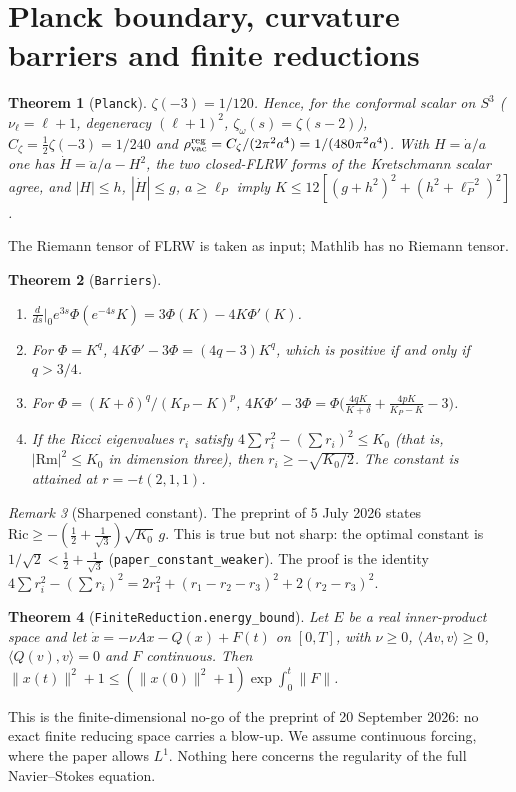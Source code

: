 \documentclass[11pt]{article}
\newtheorem{theorem}{Theorem}[section]
\theoremstyle{remark}
\newtheorem{remark}[theorem]{Remark}
\newcommand{\lean}[1]{\texttt{#1}}
\begin{document}
\section{Planck boundary, curvature barriers and finite reductions}
\begin{theorem}[\lean{Planck}]
$\zeta(-3)=1/120$. Hence, for the conformal scalar on $S^3$ ($\nu_\ell=\ell+1$, degeneracy
$(\ell+1)^2$, $\zeta_\omega(s)=\zeta(s-2)$), $C_\zeta=\tfrac12\zeta(-3)=1/240$ and
$\rho^{\rm reg}_{\rm vac}=C_\zeta/(2\pi^2a^4)=1/(480\pi^2a^4)$. With $H=\dot a/a$ one has
$\dot H=\ddot a/a-H^2$, the two closed-FLRW forms of the Kretschmann scalar agree, and
$|H|\le h$, $|\dot H|\le g$, $a\ge\ell_P$ imply
$K\le12[(g+h^2)^2+(h^2+\ell_P^{-2})^2]$.
\end{theorem}
The Riemann tensor of FLRW is taken as input; Mathlib has no Riemann tensor.

\begin{theorem}[\lean{Barriers}]
\begin{enumerate}
\item $\frac{d}{ds}\big|_{0}e^{3s}\Phi(e^{-4s}K)=3\Phi(K)-4K\Phi'(K)$.
\item For $\Phi=K^q$, $4K\Phi'-3\Phi=(4q-3)K^q$, which is positive if and only if $q>3/4$.
\item For $\Phi=(K+\delta)^q/(K_P-K)^p$,
$4K\Phi'-3\Phi=\Phi\bigl(\tfrac{4qK}{K+\delta}+\tfrac{4pK}{K_P-K}-3\bigr)$.
\item If the Ricci eigenvalues $r_i$ satisfy $4\sum r_i^2-(\sum r_i)^2\le K_0$ (that is,
$|\mathrm{Rm}|^2\le K_0$ in dimension three), then $r_i\ge-\sqrt{K_0/2}$. The constant is
attained at $r=-t(2,1,1)$.
\end{enumerate}
\end{theorem}
\begin{remark}[Sharpened constant]
The preprint of 5 July 2026 states $\mathrm{Ric}\ge-(\frac12+\frac1{\sqrt3})\sqrt{K_0}\,g$.
This is true but not sharp: the optimal constant is $1/\sqrt2<\frac12+\frac1{\sqrt3}$
(\lean{paper\_constant\_weaker}). The proof is the identity
$4\sum r_i^2-(\sum r_i)^2=2r_1^2+(r_1-r_2-r_3)^2+2(r_2-r_3)^2$.
\end{remark}

\begin{theorem}[\lean{FiniteReduction.energy\_bound}]
Let $E$ be a real inner-product space and let $\dot x=-\nu Ax-Q(x)+F(t)$ on $[0,T]$, with
$\nu\ge0$, $\langle Av,v\rangle\ge0$, $\langle Q(v),v\rangle=0$ and $F$ continuous. Then
$\|x(t)\|^2+1\le(\|x(0)\|^2+1)\exp\int_0^t\|F\|$.
\end{theorem}
This is the finite-dimensional no-go of the preprint of 20 September 2026: no exact finite
reducing space carries a blow-up. We assume continuous forcing, where the paper allows $L^1$.
Nothing here concerns the regularity of the full Navier--Stokes equation.
\end{document}
